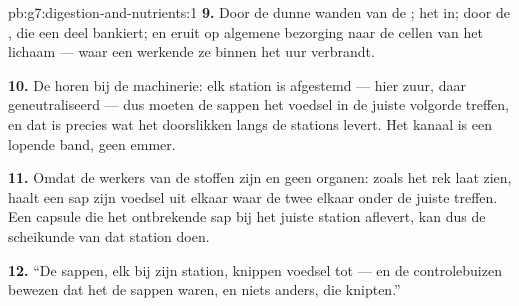 \begin{solution}{pb:g7:digestion-and-nutrients:1}
\textbf{9.} Door de dunne wanden van de ; het  in; door de
, die een deel bankiert; en eruit op algemene bezorging naar de
cellen van het lichaam --- waar een werkende  ze binnen het uur
verbrandt.

\textbf{10.} De  horen bij de machinerie: elk station is
afgestemd --- hier zuur, daar geneutraliseerd --- dus moeten de sappen het
voedsel in de juiste volgorde treffen, en dat is precies wat het
doorslikken langs de stations levert. Het kanaal is een lopende band, geen
emmer.

\textbf{11.} Omdat de werkers van de  stoffen zijn en geen
organen: zoals het rek laat zien, haalt een sap zijn voedsel uit elkaar
waar de twee elkaar onder de juiste  treffen. Een capsule
die het ontbrekende sap bij het juiste station aflevert, kan dus de
scheikunde van dat station doen.

\textbf{12.} ``De sappen, elk bij zijn station, knippen voedsel tot
 --- en de controlebuizen bewezen dat het de sappen waren,
en niets anders, die knipten.''
\end{solution}
